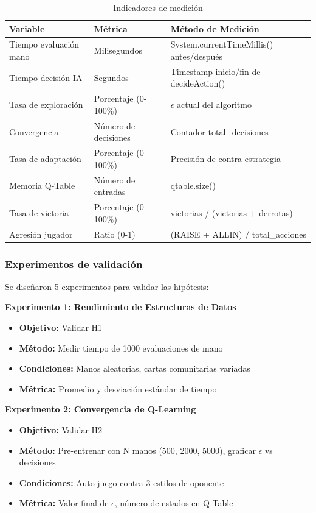 \documentclass[12pt,a4paper]{article}
\begin{document}
\begin{table}[H]
\centering
\caption{Indicadores de medición}
\begin{tabular}{|p{4cm}|p{4cm}|p{5cm}|}
\hline
\textbf{Variable} & \textbf{Métrica} & \textbf{Método de Medición} \\
\hline
Tiempo evaluación mano & Milisegundos & System.currentTimeMillis() antes/después \\
\hline
Tiempo decisión IA & Segundos & Timestamp inicio/fin de decideAction() \\
\hline
Tasa de exploración & Porcentaje (0-100\%) & $\epsilon$ actual del algoritmo \\
\hline
Convergencia & Número de decisiones & Contador total\_decisiones \\
\hline
Tasa de adaptación & Porcentaje (0-100\%) & Precisión de contra-estrategia \\
\hline
Memoria Q-Table & Número de entradas & qtable.size() \\
\hline
Tasa de victoria & Porcentaje (0-100\%) & victorias / (victorias + derrotas) \\
\hline
Agresión jugador & Ratio (0-1) & (RAISE + ALLIN) / total\_acciones \\
\hline
\end{tabular}
\label{tab:metricas}
\end{table}

\subsubsection{Experimentos de validación}

Se diseñaron 5 experimentos para validar las hipótesis:

\textbf{Experimento 1: Rendimiento de Estructuras de Datos}
\begin{itemize}
    \item \textbf{Objetivo:} Validar H1
    \item \textbf{Método:} Medir tiempo de 1000 evaluaciones de mano
    \item \textbf{Condiciones:} Manos aleatorias, cartas comunitarias variadas
    \item \textbf{Métrica:} Promedio y desviación estándar de tiempo
\end{itemize}

\textbf{Experimento 2: Convergencia de Q-Learning}
\begin{itemize}
    \item \textbf{Objetivo:} Validar H2
    \item \textbf{Método:} Pre-entrenar con N manos (500, 2000, 5000), graficar $\epsilon$ vs decisiones
    \item \textbf{Condiciones:} Auto-juego contra 3 estilos de oponente
    \item \textbf{Métrica:} Valor final de $\epsilon$, número de estados en Q-Table
\end{itemize}
\end{document}
